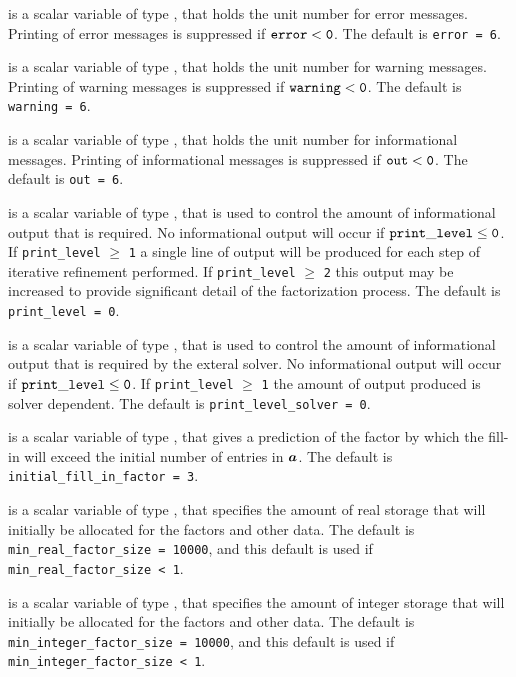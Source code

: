 \documentclass{galahad}
\begin{document}
\begin{description}

 is a scalar variable of type \integer, that holds the
unit number for error messages.
Printing of error messages is suppressed if ${\tt error} < {\tt 0}$.
The default is {\tt error = 6}.

 is a scalar variable of type \integer, that holds the
unit number for warning messages.
Printing of warning messages is suppressed if ${\tt warning} < {\tt 0}$.
The default is {\tt warning = 6}.

 is a scalar variable of type \integer, that holds the
unit number for informational messages.
Printing of informational messages is suppressed if ${\tt out} < {\tt 0}$.
The default is {\tt out = 6}.

 is a scalar variable of type \integer,
that is used
to control the amount of informational output that is required. No
informational output will occur if ${\tt print\_level} \leq {\tt 0}$. If
{\tt print\_level} $\geq$ {\tt 1} a single line of output will be produced
for each step of iterative refinement performed.
If {\tt print\_level} $\geq$ {\tt 2} this output
may be increased to provide significant detail of the factorization process.
The default is {\tt print\_level = 0}.

 is a scalar variable of type \integer,
that is used
to control the amount of informational output that is required by the exteral
solver. No
informational output will occur if ${\tt print\_level} \leq {\tt 0}$. If
{\tt print\_level} $\geq$ {\tt 1} the amount of output produced is solver
dependent.
The default is {\tt print\_level\_solver = 0}.

 is a scalar variable of type \integer,
that gives a prediction of the factor by which the fill-in will exceed
the initial number of entries in ${\bm{a}}$.
The default is {\tt initial\_fill\_in\_factor = 3}.

 is a scalar variable of type \integer,
that specifies the amount of real storage that will initially be
allocated for the factors and other data.
The default is {\tt min\_real\_factor\_size = 10000},
and this default is used if {\tt min\_real\_factor\_size < 1}.

 is a scalar variable of type \integer,
that specifies the amount of integer storage that will initially be
allocated for the factors and other data.
The default is {\tt min\_integer\_factor\_size = 10000},
and this default is used if {\tt min\_integer\_factor\_size < 1}.


\end{description}
\end{document}
